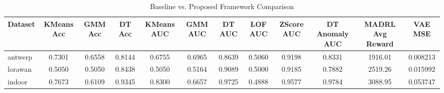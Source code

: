 \begin{table}[h]
\centering
\caption{Baseline vs. Proposed Framework Comparison}
\label{tab:results}
\begin{tabular}{lccccccccccc}
\hline
Dataset & KMeans Acc & GMM Acc & DT Acc & KMeans AUC & GMM AUC & DT AUC & LOF AUC & ZScore AUC & DT Anomaly AUC & MADRL Avg Reward & VAE MSE \\
\hline
antwerp & 0.7301 & 0.6558 & 0.8144 & 0.6755 & 0.6965 & 0.8639 & 0.5060 & 0.9198 & 0.8331 & 1916.01 & 0.008213 \\
lorawan & 0.5050 & 0.5050 & 0.8438 & 0.5050 & 0.5164 & 0.9089 & 0.5000 & 0.9185 & 0.7882 & 2519.26 & 0.015992 \\
indoor & 0.7673 & 0.6109 & 0.9345 & 0.8300 & 0.6657 & 0.9725 & 0.4888 & 0.9577 & 0.9784 & 3088.95 & 0.053747 \\
\hline
\end{tabular}
\end{table}
